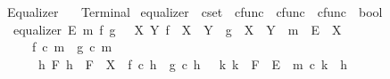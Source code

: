 %
\begin{isabellebody}%
%
%
\isadelimdocument
%
\endisadelimdocument
%
\isatagdocument
%
\isamarkuptrue%
%
\endisatagdocument
{\isafolddocument}%
%
\isadelimdocument
%
\endisadelimdocument
%
\isadelimtheory
%
\endisadelimtheory
%
\isatagtheory
{}\isamarkupfalse%
\ Equalizer\isanewline
\ \ \ Terminal\isanewline
{}%
\endisatagtheory
{\isafoldtheory}%
%
\isadelimtheory
%
\endisadelimtheory
%
\isadelimdocument
%
\endisadelimdocument
%
\isatagdocument
%
\isamarkuptrue%
%
\endisatagdocument
{\isafolddocument}%
%
\isadelimdocument
%
\endisadelimdocument
{}\isamarkupfalse%
\ equalizer\ {\isacharcolon}{\kern0pt}{\isacharcolon}{\kern0pt}\ {\isachardoublequoteopen}cset\ {\isasymRightarrow}\ cfunc\ {\isasymRightarrow}\ cfunc\ {\isasymRightarrow}\ cfunc\ {\isasymRightarrow}\ bool{\isachardoublequoteclose}\ \isanewline
\ \ {\isachardoublequoteopen}equalizer\ E\ m\ f\ g\ {\isasymlongleftrightarrow}\ {\isacharparenleft}{\kern0pt}{\isasymexists}\ X\ Y{\isachardot}{\kern0pt}\ {\isacharparenleft}{\kern0pt}f\ {\isacharcolon}{\kern0pt}\ X\ {\isasymrightarrow}\ Y{\isacharparenright}{\kern0pt}\ {\isasymand}\ {\isacharparenleft}{\kern0pt}g\ {\isacharcolon}{\kern0pt}\ X\ {\isasymrightarrow}\ Y{\isacharparenright}{\kern0pt}\ {\isasymand}\ {\isacharparenleft}{\kern0pt}m\ {\isacharcolon}{\kern0pt}\ E\ {\isasymrightarrow}\ X{\isacharparenright}{\kern0pt}\isanewline
\ \ \ \ {\isasymand}\ {\isacharparenleft}{\kern0pt}f\ {\isasymcirc}\isactrlsub c\ m\ {\isacharequal}{\kern0pt}\ g\ {\isasymcirc}\isactrlsub c\ m{\isacharparenright}{\kern0pt}\isanewline
\ \ \ \ {\isasymand}\ {\isacharparenleft}{\kern0pt}{\isasymforall}\ h\ F{\isachardot}{\kern0pt}\ {\isacharparenleft}{\kern0pt}{\isacharparenleft}{\kern0pt}h\ {\isacharcolon}{\kern0pt}\ F\ {\isasymrightarrow}\ X{\isacharparenright}{\kern0pt}\ {\isasymand}\ {\isacharparenleft}{\kern0pt}f\ {\isasymcirc}\isactrlsub c\ h\ {\isacharequal}{\kern0pt}\ g\ {\isasymcirc}\isactrlsub c\ h{\isacharparenright}{\kern0pt}{\isacharparenright}{\kern0pt}\ {\isasymlongrightarrow}\ {\isacharparenleft}{\kern0pt}{\isasymexists}{\isacharbang}{\kern0pt}\ k{\isachardot}{\kern0pt}\ {\isacharparenleft}{\kern0pt}k\ {\isacharcolon}{\kern0pt}\ F\ {\isasymrightarrow}\ E{\isacharparenright}{\kern0pt}\ {\isasymand}\ m\ {\isasymcirc}\isactrlsub c\ k\ {\isacharequal}{\kern0pt}\ h{\isacharparenright}{\kern0pt}{\isacharparenright}{\kern0pt}{\isacharparenright}{\kern0pt}{\isachardoublequoteclose}\isanewline

\end{isabellebody}
